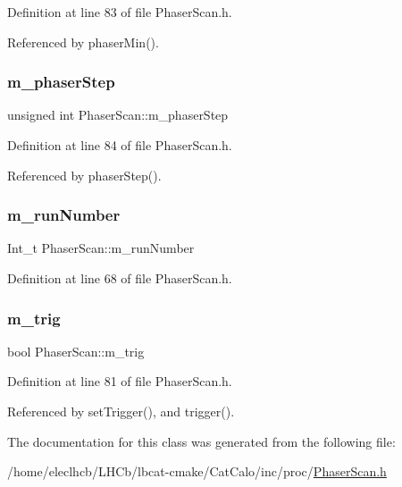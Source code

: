 Definition at line 83 of file Phaser\+Scan.\+h.



Referenced by phaser\+Min().

\mbox{\label{classPhaserScan_aed5bcb2582744f73a6189544c272213b}} 
\subsubsection{\texorpdfstring{m\+\_\+phaser\+Step}{m\_phaserStep}}
{\footnotesize\ttfamily unsigned int Phaser\+Scan\+::m\+\_\+phaser\+Step\hspace{0.3cm}{\ttfamily [private]}}



Definition at line 84 of file Phaser\+Scan.\+h.



Referenced by phaser\+Step().

\mbox{\label{classPhaserScan_a158add7f69adba5e4623afda6c9b31e2}} 
\subsubsection{\texorpdfstring{m\+\_\+run\+Number}{m\_runNumber}}
{\footnotesize\ttfamily Int\+\_\+t Phaser\+Scan\+::m\+\_\+run\+Number\hspace{0.3cm}{\ttfamily [private]}}



Definition at line 68 of file Phaser\+Scan.\+h.

\mbox{\label{classPhaserScan_ab3fd16cfcce13a09f5c1e91d96de60e6}} 
\subsubsection{\texorpdfstring{m\+\_\+trig}{m\_trig}}
{\footnotesize\ttfamily bool Phaser\+Scan\+::m\+\_\+trig\hspace{0.3cm}{\ttfamily [private]}}



Definition at line 81 of file Phaser\+Scan.\+h.



Referenced by set\+Trigger(), and trigger().



The documentation for this class was generated from the following file\+:\begin{DoxyCompactItemize}
\item 
/home/eleclhcb/\+L\+H\+Cb/lbcat-\/cmake/\+Cat\+Calo/inc/proc/\hyperlink{PhaserScan_8h}{Phaser\+Scan.\+h}\end{DoxyCompactItemize}
